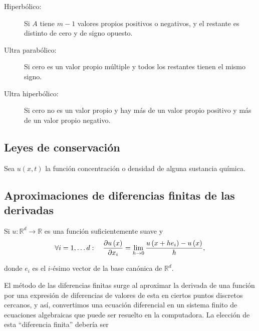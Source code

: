 \begin{definition}[Clasificación]
\begin{description}
        \item[Hiperbólico:]

            Si $A$ tiene $m-1$ valores propios positivos o negativos,
            y el restante es distinto de cero y de signo opuesto.

        \item[Ultra parabólico:]

            Si cero es un valor propio múltiple y todos los restantes
            tienen el mismo signo.

        \item[Ultra hiperbólico:]

            Si cero no es un valor propio y hay más de un valor
            propio positivo y más de un valor propio negativo.
    \end{description}
\end{definition}

\subsection{Leyes de conservación}

Sea
\begin{math}
    u\left(x,t\right)
\end{math}
la función concentración o densidad de alguna sustancia química.

\subsection{Aproximaciones de diferencias finitas de las derivadas}

Si $u\colon\mathbb{R}^d\to\mathbb{R}$ es una función suficientemente
suave y
\begin{equation*}
    \forall i=1,\dotsc d:\quad
    \diffp{u\left(x\right)}{x_{i}}=
    \lim\limits_{h\to0}
    \dfrac{
        u\left(x+he_{i}\right)-
        u\left(x\right)}{h},
\end{equation*}

donde $e_{i}$ es el $i$-ésimo vector de la base canónica de
$\mathbb{R}^d$.

El método de las diferencias finitas surge al aproximar la derivada
de una función por una expresión de diferencias de valores de esta en
ciertos puntos discretos cercanos, y así, convertimos una ecuación
diferencial en un sistema finito de ecuaciones algebraicas que puede
ser resuelto en la computadora.
La elección de esta ``diferencia finita'' debería ser

